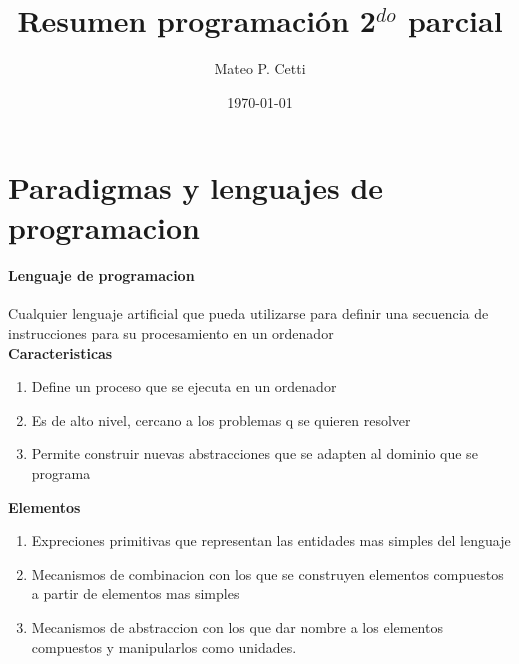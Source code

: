 \documentclass[11pt]{article}
\title{ Resumen programación 2$^{do}$ parcial}
\author{ Mateo P. Cetti }
\date{\today}
\begin{document}
\maketitle	
\pagebreak



\section{Paradigmas y lenguajes de programacion}
\paragraph{Lenguaje de programacion}
Cualquier lenguaje artificial que pueda utilizarse para definir una secuencia de instrucciones para su procesamiento
en un ordenador\\
\textbf{Caracteristicas}
\begin{enumerate}
	\item Define un proceso que se ejecuta en un ordenador
	\item Es de alto nivel, cercano a los problemas q se quieren resolver
	\item Permite construir nuevas abstracciones que se adapten al dominio que se programa
\end{enumerate}
\textbf{Elementos}
\begin{enumerate}
	\item Expreciones primitivas que representan las entidades mas simples del lenguaje
	\item Mecanismos de combinacion con los que se construyen elementos compuestos a partir de elementos mas simples
	\item Mecanismos de abstraccion con los que dar nombre a los elementos compuestos y manipularlos como unidades.
\end{enumerate}
\end{document}
